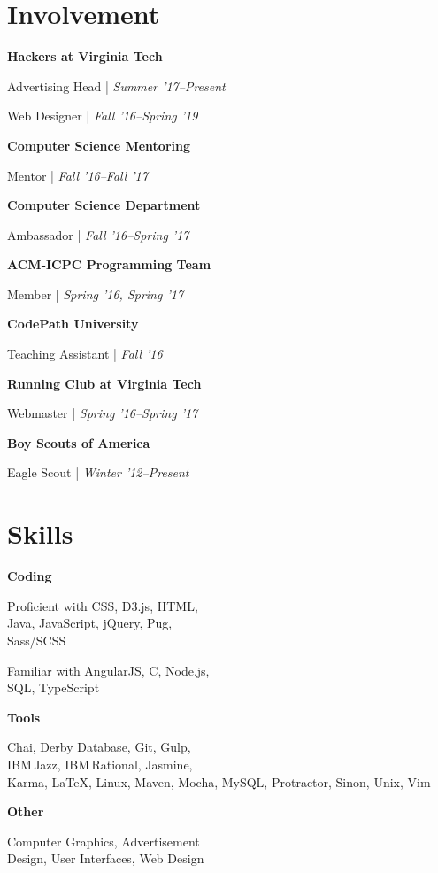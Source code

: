 \documentclass[9pt]{extarticle}
\newcommand{\Subsection}[2]{
    {\normalsize\bfseries\color{subsection}#1}
    \begin{trivlist}
        \color{bullet}#2
    \end{trivlist}
}
\newcommand{\ChronoItem}[2]{
    \item {\color{bullet}#1 | {\footnotesize\textit{#2}}}
}
\begin{document}
\begin{paracol}{2}
\begin{rightcolumn}
        \section{Involvement}
            \Subsection{Hackers at Virginia Tech}{
                \ChronoItem{Advertising Head}{Summer '17--Present}
                \ChronoItem{Web Designer}{Fall '16--Spring '19}
            }
            \vfill
            \Subsection{Computer Science Mentoring}{
                \ChronoItem{Mentor}{Fall '16--Fall '17}
            }
            \vfill
            \Subsection{Computer Science Department}{
                \ChronoItem{Ambassador}{Fall '16--Spring '17}
            }
            \vfill
            \Subsection{ACM-ICPC Programming Team}{
                \ChronoItem{Member}{Spring '16, Spring '17}
            }
            \vfill
            \Subsection{CodePath University}{
                \ChronoItem{Teaching Assistant}{Fall '16}
            }
            \vfill
            \Subsection{Running Club at Virginia Tech}{
                \ChronoItem{Webmaster}{Spring '16--Spring '17}
            }
            \vfill
            \Subsection{Boy Scouts of America}{
                \ChronoItem{Eagle Scout}{Winter '12--Present}
            }
        \vfill
        \section{Skills}
            \Subsection{Coding}{
                \item Proficient with CSS, D3.js, HTML,\\Java, JavaScript, jQuery, Pug,\\Sass/SCSS
                \item Familiar with AngularJS, C, Node.js,\\SQL, TypeScript
            }
            \vfill
            \Subsection{Tools}{
                \item Chai, Derby Database, Git, Gulp,\\IBM\,Jazz, IBM\,Rational, Jasmine,\\Karma, LaTeX, Linux, Maven, Mocha, MySQL, Protractor, Sinon, Unix, Vim
            }
            \vfill
            \Subsection{Other}{
                \item Computer Graphics, Advertisement\\Design, User Interfaces, Web Design
            }
        \pagebreak
    \end{rightcolumn}
\end{paracol}
\end{document}
